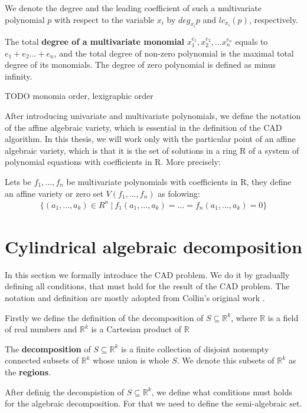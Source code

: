 \documentclass[
  digital, %
  twoside, %
  table,   %
  nolof,     %
  nolot,     %
]{fithesis3}
\begin{document}
We denote the degree and the leading coefficient of such a multivariate polynomial $p$ with respect to the variable $x_i$ by $deg_{x_i} p$ and $lc_{x_i}(p)$, respectively. 

The total \textbf{degree of a multivariate monomial} $x_1^{e_1}, x_2^{e_2}, \dots x_n^{e_n}$ equals to  $e_1 + e_2 \dots + e_n$, and the total degree of non-zero polynomial is the maximal total degree of its monomials.\cite{gathen_gerhard_2013} The degree of zero polynomial is defined as minus infinity.

TODO monomia order, lexigraphic order

After introducing univariate and multivariate polynomials, we define the notation of the affine algebraic variety, which is essential in the definition of the CAD algorithm. In this thesis, we will work only with the particular point of an affine algebraic variety, which is that it is the set of solutions in a ring R of a system of polynomial equations with coefficients in R. More precisely:

\begin{definition}
Lets be $f_1, \dots, f_n$ be multivariate polynomials with coefficients in R, they define an affine variety or zero set $V(f_1, \dots, f_n)$ as folowing:
\begin{align*}
\{(a_1, \dots, a_k) \in R^n \ |\ f_1(a_1, \dots, a_k) = \dots = f_n(a_1, \dots, a_k) = 0\}
\end{align*}
\end{definition}



\section{Cylindrical algebraic decomposition}
In this section we formally introduce the CAD problem. We do it by gradually defining all conditions, that must hold for the result of the CAD problem.
 The notation and definition are mostly adopted from Collin's original work .
 
 Firstly we define the definition of the decomposition of $S \subseteq \mathbb{R}^k$, where $\mathbb{R}$ is a field of real numbers and $\mathbb{R}^k$ is a Cartesian product of $\mathbb{R}$
 \begin{definition}
 The \textbf{decomposition} of $S \subseteq\mathbb{R}^k$ is a finite collection of disjoint nonempty connected subsets of $\mathbb{R}^k$ whose union is whole $S$. We denote this subsets of $\mathbb{R}^k$ as the \textbf{regions}. 
\end{definition}
After definig the decompistion of $S \subseteq \mathbb{R}^k$, we define what conditions must holds for the algebraic decomposition. For that we need to define the semi-algebraic set.
\end{document}
